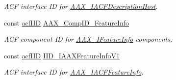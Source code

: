 \begin{Indent}
\begin{DoxyCompactItemize}
\begin{DoxyCompactList}\small\item\em A\+CF interface ID for \mbox{\hyperlink{a01649}{A\+A\+X\+\_\+\+I\+A\+C\+F\+Description\+Host}}. \end{DoxyCompactList}\item 
const \mbox{\hyperlink{a00269_a59df0b41744eee7a066787aaedf97f67}{acf\+I\+ID}} \mbox{\hyperlink{a00683_aae0f0aac0bf016668407259eb98a0c81}{A\+A\+X\+\_\+\+Comp\+I\+D\+\_\+\+Feature\+Info}}
\begin{DoxyCompactList}\small\item\em A\+CF component ID for \mbox{\hyperlink{a01829}{A\+A\+X\+\_\+\+I\+Feature\+Info}} components. \end{DoxyCompactList}\item 
const \mbox{\hyperlink{a00269_a59df0b41744eee7a066787aaedf97f67}{acf\+I\+ID}} \mbox{\hyperlink{a00683_a4bc11f4b2a3f9c7ca9162c6b3689978e}{I\+I\+D\+\_\+\+I\+A\+A\+X\+Feature\+Info\+V1}}
\begin{DoxyCompactList}\small\item\em A\+CF interface ID for \mbox{\hyperlink{a01689}{A\+A\+X\+\_\+\+I\+A\+C\+F\+Feature\+Info}}. \end{DoxyCompactList}\end{DoxyCompactItemize}
\end{Indent}
